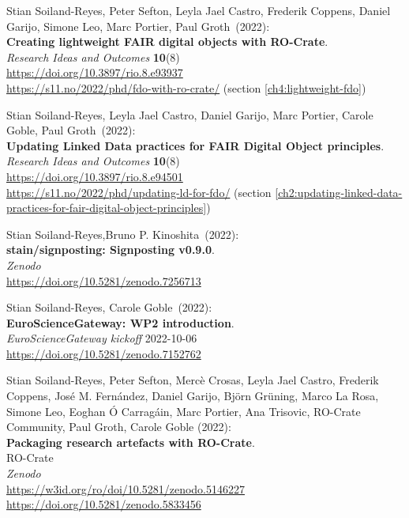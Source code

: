 \begin{thebibliography}{9}
Stian Soiland-Reyes, Peter Sefton, Leyla Jael Castro, Frederik Coppens,
Daniel Garijo, Simone Leo, Marc Portier, Paul Groth~(2022): \\
\textbf{Creating lightweight FAIR digital objects with RO-Crate}.\\
\emph{Research Ideas and Outcomes} \textbf{10}(8) \\
\url{https://doi.org/10.3897/rio.8.e93937} \\
\url{https://s11.no/2022/phd/fdo-with-ro-crate/}
(section \vref{ch4:lightweight-fdo})

Stian Soiland-Reyes, Leyla Jael Castro, Daniel Garijo, Marc Portier,
Carole Goble, Paul Groth~(2022): \\
\textbf{Updating Linked Data practices for FAIR Digital Object principles}. \\
\emph{Research Ideas and Outcomes} \textbf{10}(8)\\
\url{https://doi.org/10.3897/rio.8.e94501}\\
\url{https://s11.no/2022/phd/updating-ld-for-fdo/} (section \vref{ch2:updating-linked-data-practices-for-fair-digital-object-principles})

Stian Soiland-Reyes,Bruno P. Kinoshita~(2022): \\
\textbf{stain/signposting: Signposting v0.9.0}.\\
\emph{Zenodo}\\
\url{https://doi.org/10.5281/zenodo.7256713}

Stian Soiland-Reyes, Carole Goble~(2022): \\
\textbf{EuroScienceGateway: WP2 introduction}.\\
\emph{EuroScienceGateway kickoff} 2022-10-06\\
\url{https://doi.org/10.5281/zenodo.7152762}

Stian Soiland-Reyes, Peter Sefton, Mercè Crosas, Leyla Jael Castro, Frederik Coppens, José M. Fernández, Daniel Garijo, Björn Grüning, Marco La Rosa, Simone Leo, Eoghan Ó Carragáin, Marc Portier, Ana Trisovic, RO-Crate Community, Paul Groth, Carole Goble (2022): \\
\textbf{Packaging research artefacts with RO-Crate}. \\
RO-Crate\\
\emph{Zenodo}\\
\url{https://w3id.org/ro/doi/10.5281/zenodo.5146227} \\
\url{https://doi.org/10.5281/zenodo.5833456}



\end{thebibliography}
